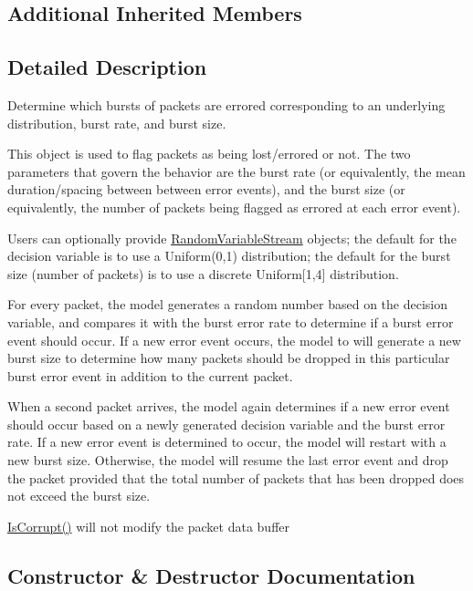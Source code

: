 \subsection*{Additional Inherited Members}


\subsection{Detailed Description}
Determine which bursts of packets are errored corresponding to an underlying distribution, burst rate, and burst size. 

This object is used to flag packets as being lost/errored or not. The two parameters that govern the behavior are the burst rate (or equivalently, the mean duration/spacing between between error events), and the burst size (or equivalently, the number of packets being flagged as errored at each error event).

Users can optionally provide \hyperlink{classns3_1_1RandomVariableStream}{Random\+Variable\+Stream} objects; the default for the decision variable is to use a Uniform(0,1) distribution; the default for the burst size (number of packets) is to use a discrete Uniform\mbox{[}1,4\mbox{]} distribution.

For every packet, the model generates a random number based on the decision variable, and compares it with the burst error rate to determine if a burst error event should occur. If a new error event occurs, the model to will generate a new burst size to determine how many packets should be dropped in this particular burst error event in addition to the current packet.

When a second packet arrives, the model again determines if a new error event should occur based on a newly generated decision variable and the burst error rate. If a new error event is determined to occur, the model will restart with a new burst size. Otherwise, the model will resume the last error event and drop the packet provided that the total number of packets that has been dropped does not exceed the burst size.

\hyperlink{classns3_1_1ErrorModel_af75222d384e342b46d0aed09d5e3a3fd}{Is\+Corrupt()} will not modify the packet data buffer 

\subsection{Constructor \& Destructor Documentation}
